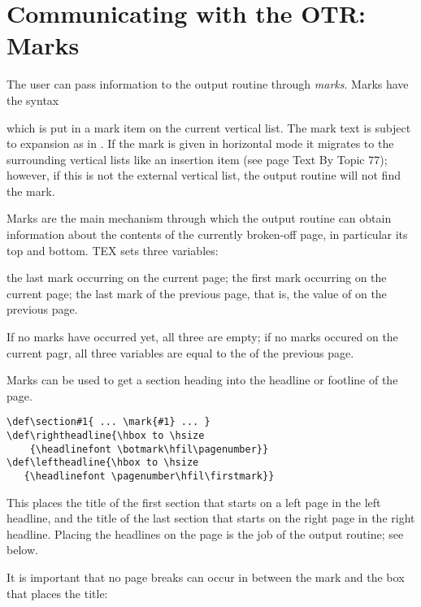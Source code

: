 \section{Communicating with the OTR: Marks}

\begin{multicols}{2}
The user can pass information to the output routine through \textit{marks}. Marks have the syntax

\begin{teX}
\end{teX}

which is put in a mark item on the current vertical list. The mark text is subject to expansion
as in .
If the mark is given in horizontal mode it migrates to the surrounding vertical lists like an
insertion item (see page Text By Topic 77); however, if this is not the external vertical list, the output routine
will not find the mark.

Marks are the main mechanism through which the output routine can obtain information
about the contents of the currently broken-off page, in particular its top and bottom. TEX sets
three variables:

{\obeylines
{} the last mark occurring on the current page;
 the first mark occurring on the current page;
 the last mark of the previous page, that is, the value of  on the previous
page.
}



If no marks have occurred yet, all three are empty; if no marks occured on the current pagr, all three variables are equal to the  of the previous page. 

Marks can be used to get a section heading into the headline or footline of the page.

\begin{verbatim}
\def\section#1{ ... \mark{#1} ... }
\def\rightheadline{\hbox to \hsize
    {\headlinefont \botmark\hfil\pagenumber}}
\def\leftheadline{\hbox to \hsize
   {\headlinefont \pagenumber\hfil\firstmark}}
\end{verbatim}

This places the title of the first section that starts on a left page in the left
headline, and the title of the last section that starts on the right page in
the right headline. Placing the headlines on the page is the job of the output
routine; see below.

It is important that no page breaks can occur in between the mark and the
box that places the title:

\begin{teXXX}
\def\section#1{ ...
   \penalty\beforesectionpenalty
   \mark{#1}
   \hbox{ ... #1 ...}
   \nobreak
   \vskip\aftersectionskip
   \noindent}
\end{teXXX}
\end{multicols}
